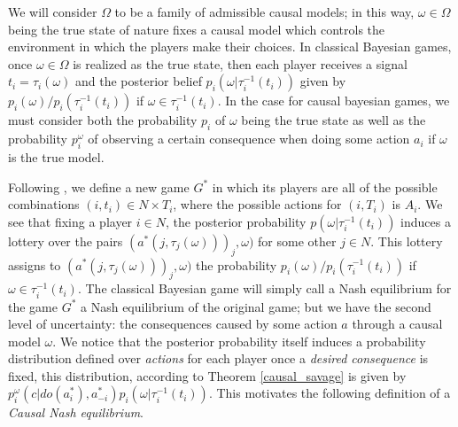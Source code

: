 \documentclass{svjour3}                     %
\begin{document}
We will consider $\Omega$ to be a family of admissible causal models; in this way,  $\omega \in \Omega$ being the true state of nature fixes a causal model which controls the environment in which the players make their choices. In classical Bayesian games, once $\omega \in \Omega$ is realized as the true state, then each player receives a signal $t_i=\tau_i (\omega)$ and the posterior belief $p_i(\omega | \tau^{-1}_i (t_i) )$ given by $p_i(\omega) / p_i (\tau^{-1}_i (t_i))$ if $\omega \in \tau^{-1}_i (t_i)$. In the case for causal bayesian games, we must consider both the probability $p_i$ of $\omega$ being the true state as well as the probability $p^\omega_i$ of observing a certain consequence when doing some action $a_i$ if $\omega$ is the true model.

Following \cite{osborne1994course}, we define a new game $G^\ast$ in which its players are all of the possible combinations $(i, t_i) \in N \times T_i$, where the possible actions for $(i,T_i)$ is $A_i$. We see that fixing a player $i \in N$, the posterior probability $p(\omega | \tau^{-1}_i (t_i))$ induces a lottery over the pairs $(a^\ast(j,\tau_j(\omega)))_j,\omega)$ for some other $j \in N$. This lottery assigns to $(a^\ast(j,\tau_j(\omega)))_j,\omega)$ the probability $p_i(\omega) / p_i (\tau^{-1}_i (t_i))$ if $\omega \in \tau^{-1}_i (t_i)$. The classical Bayesian game will simply call a Nash equilibrium for the game $G^\ast$ a Nash equilibrium of the original game; but we have the second level of uncertainty: the consequences caused by some action $a$ through a causal model $\omega$. We notice that the posterior probability itself induces a probability distribution defined over \textit{actions} for each player once a \textit{desired consequence} is fixed, this distribution, according to Theorem \ref{causal_savage} is given by $p^\omega_i (c | do(a^\ast_i), a^\ast_{-i}) p_i(\omega | \tau^{-1}_i (t_i))$. This motivates the following definition of a \textit{Causal Nash equilibrium}.
\end{document}
